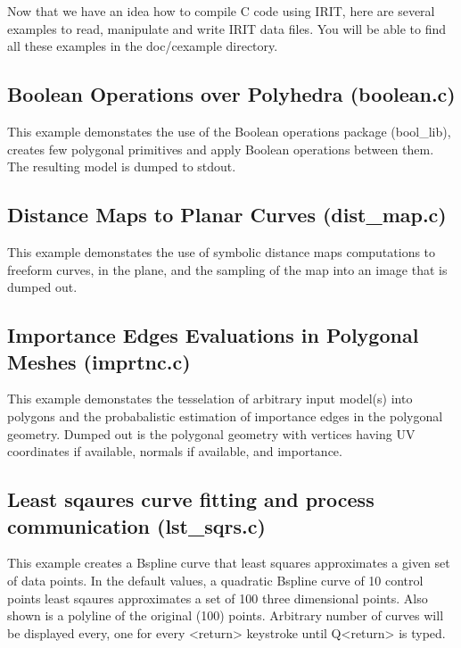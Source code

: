 {Now that we have an idea how to compile C code using IRIT, here are several
examples to read, manipulate and write IRIT data files. You will be able to
find all these examples in the doc/cexample directory.

\subsection{Boolean Operations over Polyhedra (boolean.c)}

This example demonstates the use of the Boolean operations package
(bool\_lib), creates few polygonal primitives and apply Boolean
operations between them.  The resulting model is dumped to stdout.



\subsection{Distance Maps to Planar Curves (dist\_map.c)}

This example demonstates the use of symbolic distance maps
computations to freeform curves, in the plane, and the sampling
of the map into an image that is dumped out.



\subsection{Importance Edges Evaluations in Polygonal Meshes (imprtnc.c)}

This example demonstates the tesselation of arbitrary input model(s)
into polygons and the probabalistic estimation of importance edges in the
polygonal geometry.  Dumped out is the polygonal geometry with vertices
having UV coordinates if available, normals if available, and importance.



\subsection{Least sqaures curve fitting and process communication (lst\_sqrs.c)}

This example creates a Bspline curve that least squares approximates
a given set of data points. In the default values, a quadratic Bspline
curve of 10 control points least sqaures approximates a set of 100
three dimensional points. Also shown is a polyline of the original
(100) points. Arbitrary number of curves will be displayed every, one
for every <return> keystroke until Q<return> is typed.

}
